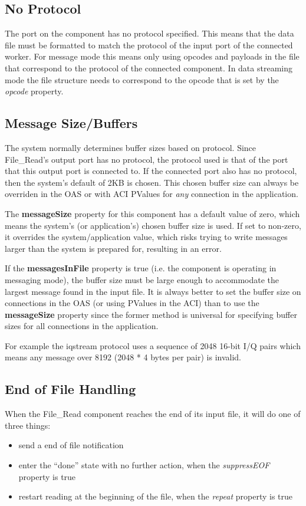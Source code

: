 \begin{flushleft}
\subsection*{No Protocol}
The port on the component has no protocol specified.  This means that the data file must be formatted to match the protocol of the input port of the connected worker.  For message mode this means only using opcodes and payloads in the file that correspond to the protocol of the connected component.  In data streaming mode the file structure needs to correspond to the opcode that is set by the \textit{opcode} property.
\subsection*{Message Size/Buffers}
The system normally determines buffer sizes based on protocol.  Since File\_Read's output port has no protocol, the protocol used is that of the port that this output port is connected to.  If the connected port also has no protocol, then the system's default of 2KB is chosen.  This chosen buffer size can always be overriden in the OAS or with ACI PValues for \textit{any} connection in the application.\\ \medskip

The \textbf{messageSize} property for this component has a default value of zero, which means the system's (or application's) chosen buffer size is used.  If set to non-zero, it overrides the system/application value, which risks trying to write messages larger than the system is prepared for, resulting in an error.\\ \medskip

If the \textbf{messagesInFile} property is true (i.e. the component is operating in messaging mode), the buffer size must be large enough to accommodate the largest message found in the input file.  It is always better to set the buffer size on connections in the OAS (or using PValues in the ACI) than to use the \textbf{messageSize} property since the former method is universal for specifying buffer sizes for all connections in the application.\\ \medskip

For example the iqstream protocol uses a sequence of 2048 16-bit I/Q pairs which means any message over 8192 (2048 * 4 bytes per pair) is invalid.
\subsection*{End of File Handling}
When the File\_Read component reaches the end of its input file, it will do one of three
things:
\begin{itemize}
  \item send a end of file notification
  \item enter the ``done'' state with no further action, when the \textit{suppressEOF} property
is true
  \item restart reading at the beginning of the file, when the \textit{repeat} property is true
\end{itemize}
\end{flushleft}

